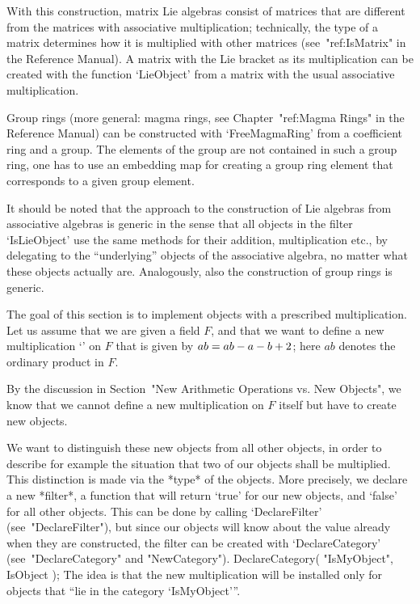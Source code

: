 With this construction, matrix Lie algebras consist of matrices that are
different from the matrices with associative multiplication;
technically, the type of a matrix determines how it is multiplied with
other matrices (see~"ref:IsMatrix" in the Reference Manual).
A matrix with the Lie bracket as its multiplication can be created with
the function `LieObject'
from a matrix with the usual associative multiplication.

Group rings (more general: magma rings,
see Chapter~"ref:Magma Rings" in the Reference Manual)
can be constructed with `FreeMagmaRing' from a coefficient ring
and a group.
The elements of the group are not contained in such a group ring, 
one has to use an embedding map for creating a group ring element that
corresponds to a given group element.

It should be noted that the {\GAP} approach to the construction of
Lie algebras from associative algebras is generic in the sense
that all objects in the filter `IsLieObject' use the same methods
for their addition, multiplication etc.,
by delegating to the ``underlying'' objects of the associative algebra,
no matter what these objects actually are.
Analogously, also the construction of group rings is generic.



The goal of this section is to implement objects with a prescribed
multiplication.
Let us assume that we are given a field $F$,
and that we want to define a new multiplication `\*' on $F$
that is given by $a \* b = a b - a - b + 2$;
here $a b$ denotes the ordinary product in $F$.

By the discussion in Section~"New Arithmetic Operations vs. New Objects",
we know that we cannot define a new multiplication on $F$ itself
but have to create new objects.

We want to distinguish these new objects from all other {\GAP} objects,
in order to describe for example the situation that two of our objects
shall be multiplied.
This distinction is made via the *type* of the objects.
More precisely, we declare a new *filter*, a function that will return
`true' for our new objects, and `false' for all other {\GAP} objects.
This can be done by calling `DeclareFilter' (see~"DeclareFilter"),
but since our objects will know about the value already when they are
constructed, the filter can be created with `DeclareCategory'
(see~"DeclareCategory" and "NewCategory").
\begintt
DeclareCategory( "IsMyObject", IsObject );
\endtt
The idea is that the new multiplication will be installed only
for objects that ``lie in the category `IsMyObject'''.


